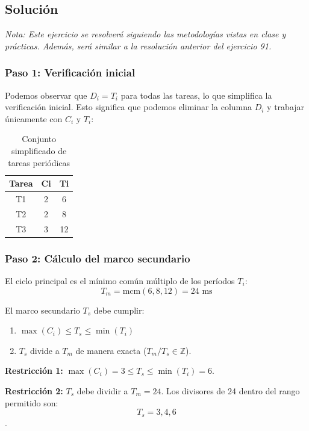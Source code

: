 \documentclass[a4paper,12pt]{article}
\begin{document}
\subsection{Solución}
\begin{tcolorbox}[colback=gray!5!white,colframe=gray!75!black]
    \textit{Nota: Este ejercicio se resolverá siguiendo las metodologías vistas en clase y prácticas. Además, será similar a la resolución anterior del ejercicio 91.}
\end{tcolorbox}

\subsubsection{Paso 1: Verificación inicial}
Podemos observar que \(D_i = T_i\) para todas las tareas, lo que simplifica la verificación inicial. Esto significa que podemos eliminar la columna \(D_i\) y trabajar únicamente con \(C_i\) y \(T_i\):

\begin{table}[H]
\centering
\begin{tabular}{|c|c|c|}
\hline
\textbf{Tarea} & \textbf{Ci} & \textbf{Ti} \\ \hline
T1 & 2 & 6 \\ \hline
T2 & 2 & 8 \\ \hline
T3 & 3 & 12 \\ \hline
\end{tabular}
\caption{Conjunto simplificado de tareas periódicas}
\end{table}

\subsubsection{Paso 2: Cálculo del marco secundario}
El ciclo principal es el mínimo común múltiplo de los períodos \(T_i\):
\[ T_m = \text{mcm}(6, 8, 12) = 24 \text{ ms} \]

El marco secundario \(T_s\) debe cumplir:
\begin{enumerate}
    \item \(\max(C_i) \leq T_s \leq \min(T_i)\)
    \item \(T_s\) divide a \(T_m\) de manera exacta (\(T_m / T_s \in \mathbb{Z}\)).
\end{enumerate}

\textbf{Restricción 1:} \(\max(C_i) = 3 \leq T_s \leq \min(T_i) = 6\).

\textbf{Restricción 2:} \(T_s\) debe dividir a \(T_m = 24\). Los divisores de 24 dentro del rango permitido son:\[T_s = 3, 4, 6\].
\end{document}
